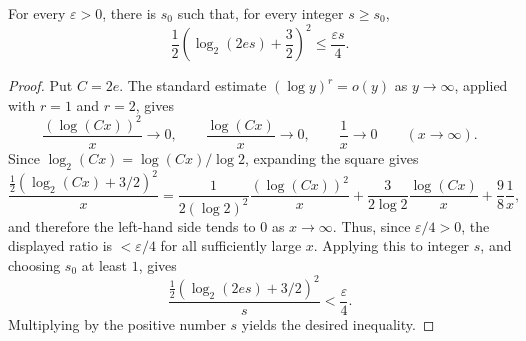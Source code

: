 \begin{helper}
For every \(\varepsilon>0\), there is \(s_0\) such that, for every
integer \(s\ge s_0\),
\[
  \frac12\left(\log_2(2es)+\frac32\right)^2
  \le \frac{\varepsilon s}{4}.
\]
\end{helper}
\begin{proof}
Put \(C=2e\).  The standard estimate \((\log y)^r=o(y)\) as
\(y\to\infty\), applied with \(r=1\) and \(r=2\), gives
\[
  \frac{(\log(Cx))^2}{x}\to0,\qquad
  \frac{\log(Cx)}{x}\to0,\qquad
  \frac1x\to0
  \qquad (x\to\infty).
\]
Since \(\log_2(Cx)=\log(Cx)/\log 2\), expanding the square gives
\[
  \frac{\frac12(\log_2(Cx)+3/2)^2}{x}
  =
  \frac{1}{2(\log 2)^2}\frac{(\log(Cx))^2}{x}
  +\frac{3}{2\log 2}\frac{\log(Cx)}{x}
  +\frac98\frac1x,
\]
and therefore the left-hand side tends to \(0\) as \(x\to\infty\).
Thus, since \(\varepsilon/4>0\), the displayed ratio is \(<\varepsilon/4\)
for all sufficiently large \(x\).  Applying this to integer \(s\), and
choosing \(s_0\) at least \(1\), gives
\[
  \frac{\frac12(\log_2(2es)+3/2)^2}{s}<\frac{\varepsilon}{4}.
\]
Multiplying by the positive number \(s\) yields the desired inequality.
\end{proof}
